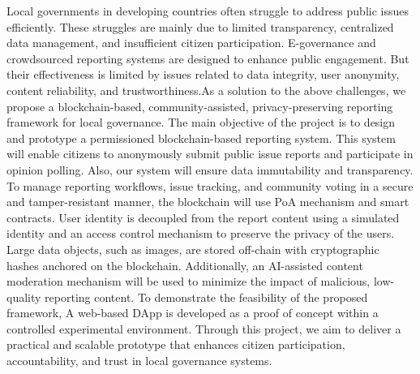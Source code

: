 \documentclass[a4paper,12pt]{report}
\begin{document}
	


\setcounter{page}{1}
\pagestyle{romanstyle}



Local governments in developing countries often struggle to address public issues efficiently. These struggles are mainly due to limited transparency, centralized data management, and insufficient citizen participation. E-governance and crowdsourced reporting systems are designed to enhance public engagement. But their effectiveness is limited by issues related to data integrity, user anonymity, content reliability, and trustworthiness.As a solution to the above challenges, we propose a blockchain-based, community-assisted, privacy-preserving reporting framework for local governance. The main objective of the project is to design and prototype a permissioned blockchain-based reporting system. This system will enable citizens to anonymously submit public issue reports and participate in opinion polling. Also, our system will ensure data immutability and transparency. To manage reporting workflows, issue tracking, and community voting in a secure and tamper-resistant manner, the blockchain will use \ac{PoA} mechanism and smart contracts. User identity is decoupled from the report content using a simulated identity and an access control mechanism to preserve the privacy of the users. Large data objects, such as images, are stored off-chain with cryptographic hashes anchored on the blockchain. Additionally, an \ac{AI}-assisted content moderation mechanism will be used to minimize the impact of malicious, low-quality reporting content.  To demonstrate the feasibility of the proposed framework, A web-based \ac{DApp} is developed as a proof of concept within a controlled experimental environment. Through this project, we  aim to deliver a practical and scalable prototype that enhances citizen participation, accountability, and trust in local governance systems.



\tableofcontents
{} %
\end{document}
